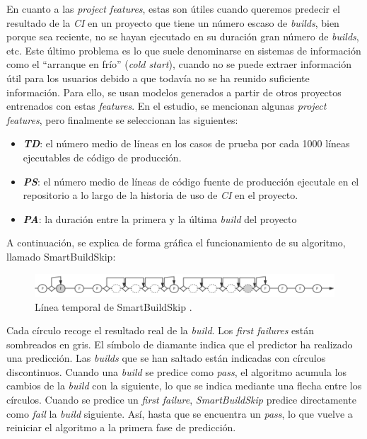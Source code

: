 En cuanto a las \textit{project features}, estas son útiles cuando queremos predecir
el resultado de la \textit{CI} en un proyecto que tiene un número escaso de \textit{builds}, bien
porque sea reciente, no se hayan ejecutado en su duración gran número de \textit{builds}, etc. Este
último problema es lo que suele denominarse en sistemas de información como el ``arranque en frío''
(\textit{cold start}), cuando no se puede extraer información útil para los usuarios debido a
que todavía no se ha reunido suficiente información. Para ello, se usan modelos generados a partir
de otros proyectos entrenados con estas \textit{features}. En el estudio, se mencionan algunas
\textit{project features}, pero finalmente se seleccionan las siguientes:

\begin{itemize}
      \item \textbf{\textit{TD}}: el número medio de líneas en los casos de prueba por cada
      1000 líneas ejecutables de código de producción.
      \item \textbf{\textit{PS}}: el número medio de líneas de código fuente de producción
      ejecutale en el repositorio a lo largo de la historia de uso de \textit{CI} en el proyecto.
      \item \textbf{\textit{PA}}: la duración entre la primera y la última \textit{build} del
      proyecto
\end{itemize}


\noindent A continuación, se explica de forma gráfica el funcionamiento de su algoritmo, llamado
SmartBuildSkip:

\begin{figure}[H]
      \centering
      \includegraphics[scale=0.49]{images/SBS.png}
      \caption{Línea temporal de SmartBuildSkip \cite{2}.}
      \label{fig:timeline SBS}
\end{figure}

Cada círculo recoge el resultado real de la \textit{build}. Los \textit{first failures} están
sombreados en gris. El símbolo de diamante indica que el predictor ha realizado una predicción.
Las \textit{builds} que se han saltado están indicadas con círculos discontinuos. Cuando una
\textit{build} se predice como \textit{pass}, el algoritmo acumula los cambios de la
\textit{build} con la siguiente, lo que se indica mediante una flecha entre los círculos. Cuando
se predice un \textit{first failure}, \textit{SmartBuildSkip} predice directamente como
\textit{fail} la \textit{build} siguiente. Así, hasta que se encuentra un \textit{pass}, lo que
vuelve a reiniciar el algoritmo a la primera fase de predicción.\\

